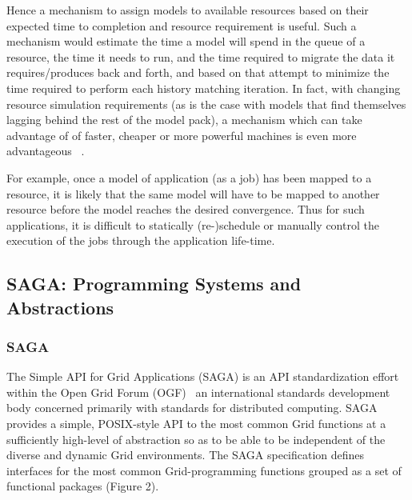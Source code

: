 \documentclass{sig-alternate}
\begin{document}
Hence a mechanism to assign models to available resources based on
their expected time to completion and resource requirement is useful.
Such a mechanism would estimate the time a model will spend in the
queue of a resource, the time it needs to run, and the time required
to migrate the data it requires/produces back and forth, and based on
that attempt to minimize the time required to perform each history
matching iteration.  In fact, with changing resource simulation
requirements (as is the case with models that find themselves lagging
behind the rest of the model pack), a mechanism which can take
advantage of of faster, cheaper or more powerful machines is even more
advantageous ~\cite{escience07}.

For example, once a model of application (as a job) has been mapped to
a resource, it is likely that the same model will have to be mapped to
another resource before the model reaches the desired convergence.
Thus for such applications, it is difficult to statically
(re-)schedule or manually control the execution of the jobs through
the application life-time.


\subsection{SAGA: Programming Systems and Abstractions}


\subsubsection{SAGA}

The Simple API for Grid Applications (SAGA) is an API standardization
effort within the Open Grid Forum (OGF)~\cite{ogf_web} an
international standards development body concerned primarily with
standards for distributed computing.  SAGA provides a simple,
POSIX-style API to the most common Grid functions at a sufficiently
high-level of abstraction so as to be able to be independent of the
diverse and dynamic Grid environments. The SAGA specification defines
interfaces for the most common Grid-programming functions grouped as a
set of functional packages (Figure 2).
\end{document}
